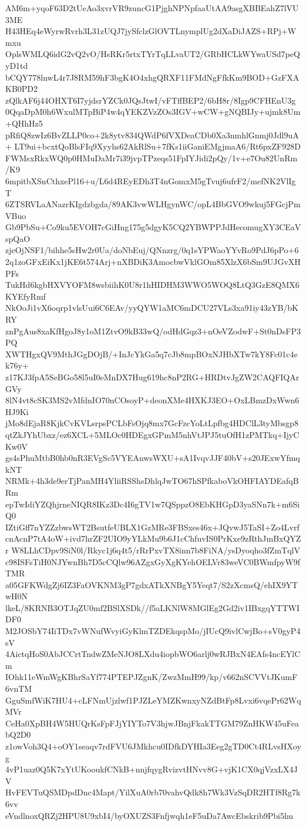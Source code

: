 AM6m+yqoF63D2tUeAo3xvrVR9zuncG1PjghNPNpfaaUtAA9asgXBBEahZ7lVU3ME
H43HEq4eWyrwRvrh3L31zUQJ7jySfclzGlOVTLnymplUg2dXaDiJAZS+RPj+Wmxu
OplsWMLQ6idG2vQ2vO/HsRKr5rtxTYrTqLLvaUT2/GRbHCLkWYwaUSd7peQyD1td
bCQY778lnwL4r7J8RM59hF3bgK4O4xhgQRXF11FMdNgFfkKm9BOD+GzFXAKB0PD2
zQlkAF6j44OHXT6I7yjdsrYZCk0JQsJtwI/vFTffBEP2/6bH8r/8Igp9CFHEnU3g
0QqaDpM0h6WxulMTpBiP4w4qYEKZVzZOs3IGV+wCW+gNQBIJy+ujmk8Um+QHhHz5
pRfiQ8zwIz6BvZLLP0co+2k8ytv834QWdP6fVXDeaCDb0Xa3nmhlGnmj0Jdl9uA+
LT9ui+bcxtQoBlsFIq9Xyyhs62AkRlSu+7fKs1iiGaniEMgjmaA6/Rt6pxZF928D
FWMsxRkxWQ0p0HMuDaMr7i39jvpTPzeqs51FpIYJidi2pQy/1v+e7Ou82UnRm/K9
6mpitbXSnCthxePl16+u/L6d4REyEDh3T4nGomxM5gTvuj6ufrF2/mefNK2VlIgT
6ZTSRVLaANazrKIgdzbgda/89AK3vwWLHgynWC/opL4BbGVO9wkuj5FGcjPmVBuo
Gb9PbSu+Co9ku5EVOH7cGiHng175g5dgyK5CQ2YBWPPJdHecomugXY3CEaVspQaO
zjeOjNSF1/bihhe5sHw2r0Ua/doNbEuj/QNnzrg/0q1sYPWaoYYvRo9PdJ6pPo+6
2q1zoGFxEiKx1jKE6t574Arj+nXBDiK3AmocbwVklGOm85XlzX6bSm9UJGvXHPFs
TukHd6kgbHXVYOFM8wsbiihK0U8r1hHIDHM3WWO5WOQ8LtQ3GzE8QMX6KYEfyRmf
NkOoJi1vX6oqrp1vlsUui6C6EAv/yyQYW1aMC6mDCU27VLs3xa91iy43zYB/bKRY
znPgAus8xaKfHgoJ8y1oM1ZtvO9kB33wQ/odHdGqz3+nOeVZodwF+St0nDsFP3PQ
XWTHgxQV9MthJGgDOjB/+InJcYkGa5q7cJb8mpBOxNJHbXTw7kY8Fc01c4ek76y+
z17KJ3fpA5SeBGo58l5uI0eMnDX7Hug619hc8nP2RG+HRDtvJgZW2CAQFIQArGVy
8lN4vt8cSK3MS2vMfdnIO70nCOsoyP+deonXMe4HXKJ3EO+OxLBmzDxWwn6HJ9Ki
jMo8dEjaR8KjkCvKVLsrpsPCLbFsOjq8mx7GcFzcYoLtLpfbg4HDClL3tyMbsgp8
qtZkJYhUbxz/ez6XCL+5MLOc0HDEgxGPmM5nhVtJPJ5tuOfH1zPMTkq+IjyCKw0V
gs4sPhuMtbB0hb0nR3EVgSc5VYEAnwsWXU+sA1IvqvJJF40bV+s20JExwYfmqkNT
NRMk+4h3de9erTjPanMH4YliiRSShsDhlqJwTO67hSPfkaboVkOHFIAYDEafqBRm
epTwIdiYZQhjrneNIQR8IKz3Dc4I6gTV1w7QSppzO8EbKHGpD3yaSNn7k+m6SiQ0
IZtiGff7nYZZzbwsWT2BsutfeUBLX1GzMRe3FBSxes46x+JQvwJ5TaSI+Zo4Lvrf
cnAcnP7tA4oW+ivd7hrZF2UIO9yYLkMu9b6J1cChfuvIS0PrKxe9zRthJmBxQYZr
W8LLhCDpv9SiN0l/Rkyc1j6q4t5/rRrPxvTX8inn7b8FiNA/ysDyoqho3fZmTqlV
c98ISFsTiH0NJYwnBh7D5cCQlw96AZgxGyXgKYehOELVr83weVC0BWmfpyW9fTMR
a05GFKWdgZj6IZ3FaOVKNM3gP7gdxATkXNBgY5Yeqt7/S2zXcmsQ/ehIX9YTwH0N
lkeL/8KRNB3OTJqZU0mf2BSlXSDk//f5aLKNlW8MGlEg2Gd2iv1IBxgqYTTWIDF0
M2JOSbY74IiTDx7vWNufWvyiGyKlmTZDEkqspMo/jIUcQ9ivlCwjBo+sV0gyP4sV
4AictqHoS0AbJCCrtTndwZMeNJO8LXdu4iopbWO6arlj0wRJBxN4EAfs4ncEYlCm
IOhk11eWmWgKBhrSaYf774PTEPJZgnK/ZwzMmH99/kp/v662nSCVVtJKumF6vnTM
GguSmfWiK7HU4+cLFNmUjzlwf1PJZLeYMZKwnxyNZdBtFp8Lvxi6vqePr62WqMVr
CeHa0XpBH4W5HUQrKsFpFJjYIYTo7V3hjwJBnjFkakTTGM79ZnHKW45uFeabQ2D0
z1owVoh3Q4+oOY1seaqv7rdFVU6JMkhcu0IDfkDYHIa3Eeg2gTD0Ct4RLvsHXoyg
4vP1uaz0Q5K7xYtUKooukfCNkB+nnjfqygRvizvtHNvv8G+vjK1CX0qjVzxLX4JV
HvFEVTuQSMDpdDnc4Mapt/YilXuA0rb70vahvQdk8h7Wk3VzSqDR2HTf8Rg7k6vv
eVndlnoxQRZj2HPU8U9xbI4/byOXUZS3Fnfjwqh1eF5uDa7AwcEbskrib9Pbi5hu
